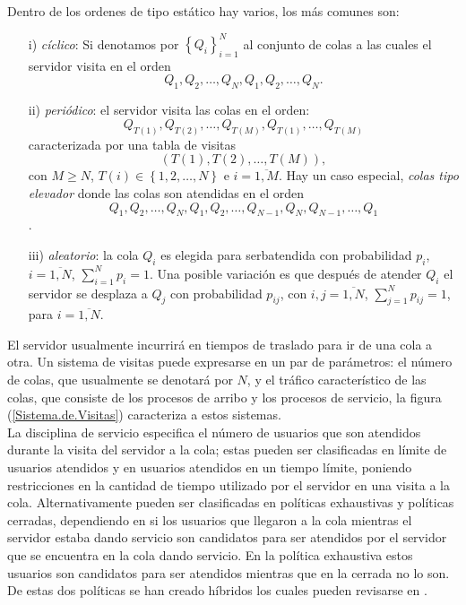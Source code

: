 \documentclass{article}
\begin{document}
Dentro de los ordenes de tipo est\'atico hay varios, los m\'as comunes son:

\begin{itemize}
\item[i)] {\em c\'iclico}: Si denotamos por $\left\{Q_{i}\right\}_{i=1}^{N}$ al conjunto de colas a las cuales el servidor visita en el orden \[Q_{1},Q_{2},\ldots,Q_{N},Q_{1},Q_{2},\ldots,Q_{N}.\]

\item[ii)] {\em peri\'odico}: el servidor visita las colas en el orden:
\[Q_{T\left(1\right)},Q_{T\left(2\right)},\ldots,Q_{T\left(M\right)},Q_{T\left(1\right)},\ldots,Q_{T\left(M\right)}\]
caracterizada por una tabla de visitas
\[\left(T\left(1\right),T\left(2\right),\ldots,T\left(M\right)\right),\]
con $M\geq N$, $T\left(i\right)\in\left\{1,2,\ldots,N\right\}$ e $i=\overline{1,M}$. Hay un caso especial, {\em colas tipo elevador} donde las colas son atendidas en el orden \[Q_{1},Q_{2},\ldots,Q_{N},Q_{1},Q_{2},\ldots,Q_{N-1},Q_{N},Q_{N-1},\ldots,Q_{1}\].

\item[iii)] {\em aleatorio}: la cola $Q_{i}$ es elegida para serbatendida con probabilidad $p_{i}$, $i=\overline{1,N}$, $\sum_{i=1}^{N}p_{i}=1$. Una posible variaci\'on es que despu\'es de atender $Q_{i}$ el servidor se desplaza a $Q_{j}$ con probabilidad $p_{ij}$, con $i,j=\overline{1,N}$, $\sum_{j=1}^{N}p_{ij}=1$, para $i=\overline{1,N}$.
\end{itemize}

El servidor usualmente incurrir\'a en tiempos de traslado para ir de una cola a otra. Un sistema de visitas puede expresarse en un par de par\'ametros: el n\'umero de colas, que usualmente se denotar\'a por $N$, y el tr\'afico caracter\'istico de las colas, que consiste de los procesos de arribo y los procesos de servicio, la figura (\ref{Sistema.de.Visitas}) caracteriza a estos sistemas.\\


La disciplina de servicio especifica el n\'umero de usuarios que son atendidos durante la visita del servidor a la cola; estas pueden ser clasificadas en l\'imite de usuarios atendidos y en usuarios atendidos en un tiempo l\'imite, poniendo restricciones en la cantidad de tiempo utilizado por el servidor en una visita a la cola. Alternativamente pueden ser clasificadas en pol\'iticas exhaustivas y pol\'iticas cerradas, dependiendo en si los usuarios que llegaron a la cola mientras el servidor estaba dando servicio son candidatos para ser atendidos por el servidor que se encuentra en la cola dando servicio. En la pol\'itica exhaustiva estos usuarios son candidatos para ser atendidos mientras que en la cerrada no lo son. De estas dos pol\'iticas se han creado h\'ibridos los cuales pueden revisarse en \cite{BoonMeiWinands}.
\end{document}

